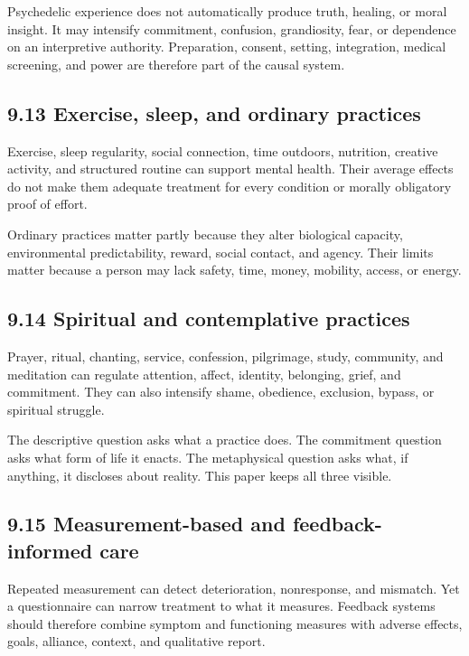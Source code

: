 \documentclass[
  11pt,
]{article}
\begin{document}
Psychedelic experience does not automatically produce truth, healing, or
moral insight. It may intensify commitment, confusion, grandiosity,
fear, or dependence on an interpretive authority. Preparation, consent,
setting, integration, medical screening, and power are therefore part of
the causal system.

\subsection{9.13 Exercise, sleep, and ordinary
practices}\label{exercise-sleep-and-ordinary-practices}

Exercise, sleep regularity, social connection, time outdoors, nutrition,
creative activity, and structured routine can support mental health.
Their average effects do not make them adequate treatment for every
condition or morally obligatory proof of effort.

Ordinary practices matter partly because they alter biological capacity,
environmental predictability, reward, social contact, and agency. Their
limits matter because a person may lack safety, time, money, mobility,
access, or energy.

\subsection{9.14 Spiritual and contemplative
practices}\label{spiritual-and-contemplative-practices}

Prayer, ritual, chanting, service, confession, pilgrimage, study,
community, and meditation can regulate attention, affect, identity,
belonging, grief, and commitment. They can also intensify shame,
obedience, exclusion, bypass, or spiritual struggle.

The descriptive question asks what a practice does. The commitment
question asks what form of life it enacts. The metaphysical question
asks what, if anything, it discloses about reality. This paper keeps all
three visible.

\subsection{9.15 Measurement-based and feedback-informed
care}\label{measurement-based-and-feedback-informed-care}

Repeated measurement can detect deterioration, nonresponse, and
mismatch. Yet a questionnaire can narrow treatment to what it measures.
Feedback systems should therefore combine symptom and functioning
measures with adverse effects, goals, alliance, context, and qualitative
report.
\end{document}
